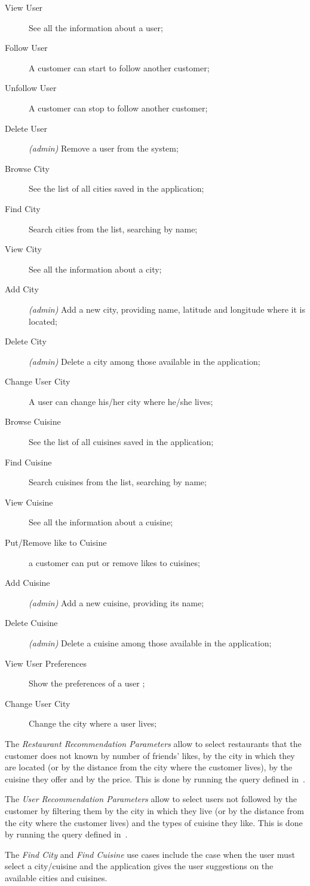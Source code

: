 \begin{description}
	\item[View User] See all the information about a user;
	\item[Follow User] A customer can start to follow another customer;
	\item[Unfollow User] A customer can stop to follow another customer;
	\item[Delete User] \textit{(admin)} Remove a user from the system;
	\item[Browse City] See the list of all cities saved in the application;
	\item[Find City] Search cities from the list, searching by name;
	\item[View City] See all the information about a city;
	\item[Add City] \textit{(admin)} Add a new city, providing name,
		latitude and longitude where it is located;
	\item[Delete City] \textit{(admin)} Delete a city among those available
		in the application;
	\item[Change User City] A user can change his/her city where he/she
		lives;
	\item[Browse Cuisine] See the list of all cuisines saved in the
		application;
	\item[Find Cuisine] Search cuisines from the list, searching by name;
	\item[View Cuisine] See all the information about a cuisine;
	\item[Put/Remove like to Cuisine] a customer can put or remove likes to
		cuisines;
	\item[Add Cuisine] \textit{(admin)} Add a new cuisine, providing its
		name;
	\item[Delete Cuisine] \textit{(admin)} Delete a cuisine among those
		available in the application;
	\item[View User Preferences] Show the preferences of a user ;
	\item[Change User City]  Change the city where a user lives;
\end{description}

The \textit{Restaurant Recommendation Parameters} allow to select restaurants
that the customer does not known by number of friends' likes, by the city in
which they are located (or by the distance from the city where the customer
lives), by the cuisine they offer and by the price. This is done by running the
query defined in~.

The \textit{User Recommendation Parameters} allow to select users not followed
by the customer by filtering them by the city in which they live (or by the
distance from the city where the customer lives) and the types of cuisine they
like. This is done by running the query defined in~.

The \emph{Find City} and \emph{Find Cuisine} use cases include the case when the
user must select a city/cuisine  and the
application gives the user suggestions on the available cities and cuisines.
